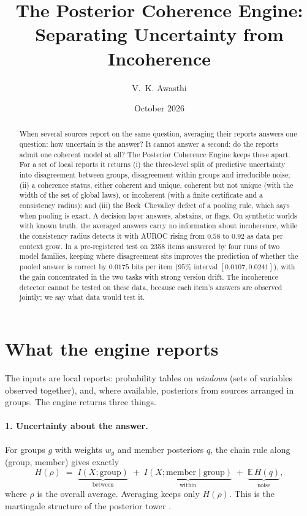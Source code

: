 \documentclass[11pt]{article}
\title{The Posterior Coherence Engine:\\ Separating Uncertainty from Incoherence}
\author{V.~K. Awasthi}
\date{October 2026}
\theoremstyle{definition}\newtheorem{definition}{Definition}
\begin{document}
\maketitle

\begin{abstract}
When several sources report on the same question, averaging their reports answers one question: how uncertain is the answer? It
cannot answer a second: do the reports admit one coherent model at all? The Posterior Coherence Engine keeps these apart. For a set
of local reports it returns (i) the three-level split of predictive uncertainty into disagreement between groups, disagreement within
groups and irreducible noise; (ii) a coherence status, either coherent and unique, coherent but not unique (with the width of the set of
global laws), or incoherent (with a finite certificate and a consistency radius); and (iii) the Beck--Chevalley defect of a pooling
rule, which says when pooling is exact. A decision layer answers, abstains, or flags. On synthetic worlds with known truth, the averaged
answers carry no information about incoherence, while the consistency radius detects it with AUROC rising from $0.58$ to $0.92$ as data
per context grow. In a pre-registered test on 2358 items answered by four runs of two model families, keeping where disagreement sits
improves the prediction of whether the pooled answer is correct by $0.0175$ bits per item ($95\%$ interval $[0.0107,0.0241]$), with
the gain concentrated in the two tasks with strong version drift. The incoherence detector cannot be tested on these data, because each
item's answers are observed jointly; we say what data would test it.
\end{abstract}

\section{What the engine reports}
The inputs are local reports: probability tables on \emph{windows} (sets of variables observed together), and, where available,
posteriors from sources arranged in groups. The engine returns three things.

\paragraph{1. Uncertainty about the answer.} For groups $g$ with weights $w_g$ and member posteriors $q$, the chain rule along
(group, member) gives exactly
\[
H(\rho)\;=\;\underbrace{I(X;\text{group})}_{\text{between}}\;+\;\underbrace{I(X;\text{member}\mid\text{group})}_{\text{within}}\;+\;\underbrace{\mathbb E\,H(q)}_{\text{noise}},
\]
where $\rho$ is the overall average. Averaging keeps only $H(\rho)$. This is the martingale structure of the posterior tower
\cite[Thm.~5.3]{Main}.
\end{document}
